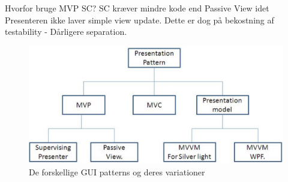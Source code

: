 Hvorfor bruge MVP SC? SC kræver mindre kode end Passive View idet Presenteren ikke laver simple view update. Dette er dog på bekostning af testability - Dårligere separation.

\begin{figure}[h]
	\centering
	\includegraphics[width=0.8\linewidth]{figs/guiPatterns}
	\caption{De forskellige GUI patterns og deres variationer}
	\label{fig:guiPatterns}
\end{figure}

